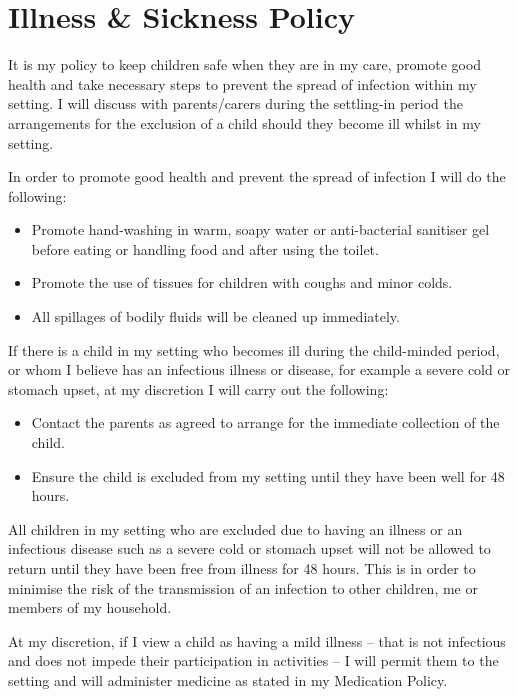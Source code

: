 

\section{Illness \& Sickness Policy}

It is my policy to keep children safe when they are in my care, promote
good health and take necessary steps to prevent the spread of infection
within my setting. I will discuss with parents/carers during the
settling-in period the arrangements for the exclusion of a child should
they become ill whilst in my setting.

In order to promote good health and prevent the spread of infection I
will do the following:

\begin{itemize}
\item
  Promote hand-washing in warm, soapy water or anti-bacterial sanitiser
  gel before eating or handling food and after using the toilet.~
\item
  Promote the use of tissues for children with coughs and minor colds.~
\item
  All spillages of bodily fluids will be cleaned up immediately.~
\end{itemize}

If there is a child in my setting who becomes ill during the
child-minded period, or whom I believe has an infectious illness or
disease, for example a severe cold or stomach upset, at my discretion I
will carry out the following:

\begin{itemize}
\item
  Contact the parents as agreed to arrange for the immediate
  collection of the child. ~
\item
  Ensure the child is excluded from my setting until they have been
  well for 48 hours.~
\end{itemize}

All children in my setting who are excluded due to having an illness or
an infectious disease such as a severe cold or stomach upset will not be
allowed to return until they have been free from illness for 48 hours.
This is in order to minimise the risk of the transmission of an
infection to other children, me or members of my household.

At my discretion, if I view a child as having a mild illness -- that is
not infectious and does not impede their participation in activities --
I will permit them to the setting and will administer medicine as stated
in my Medication Policy.

